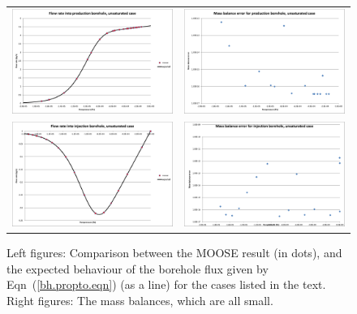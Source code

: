 \documentclass[]{scrreprt}
\begin{document}
\begin{figure}[htb]
\begin{tabular}{cc}
\includegraphics[width=7cm]{bh04.eps} &
\includegraphics[width=7cm]{bh04_mass_balance.eps} \\
\includegraphics[width=7cm]{bh05.eps} &
\includegraphics[width=7cm]{bh05_mass_balance.eps}
\end{tabular}
\caption{Left figures: Comparison between the MOOSE result (in dots), and the
  expected behaviour of the borehole flux given by
  Eqn~(\ref{bh.propto.eqn}) (as a line) for the cases listed in the text.  Right
  figures: The mass balances, which are all small.}
\label{bh02_05.fig}
\end{figure}
\end{document}
